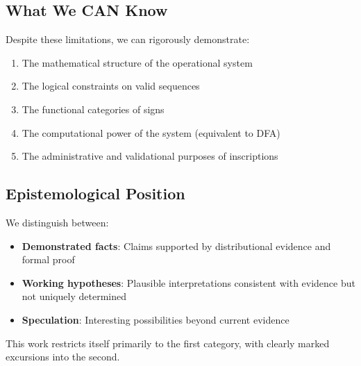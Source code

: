 \subsection{What We CAN Know}

Despite these limitations, we can rigorously demonstrate:
\begin{enumerate}
    \item The mathematical structure of the operational system
    \item The logical constraints on valid sequences
    \item The functional categories of signs
    \item The computational power of the system (equivalent to DFA)
    \item The administrative and validational purposes of inscriptions
\end{enumerate}

\subsection{Epistemological Position}

We distinguish between:
\begin{itemize}
    \item \textbf{Demonstrated facts}: Claims supported by distributional evidence and formal proof
    \item \textbf{Working hypotheses}: Plausible interpretations consistent with evidence but not uniquely determined
    \item \textbf{Speculation}: Interesting possibilities beyond current evidence
\end{itemize}

This work restricts itself primarily to the first category, with clearly marked excursions into the second.
